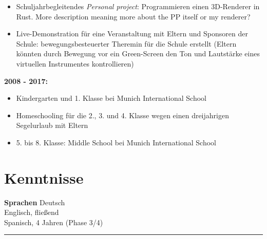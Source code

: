 \documentclass[12pt]{article}
\newcommand{\sect}[1]{\vspace{-12pt}\section*{#1}\vspace{-12pt}}
\newcommand{\sep}{{\color{gray}\vspace{-12pt}\hrule}}
\newcommand{\ask}[1]{{\color{red}#1}}
\begin{document}
{\begin{itemize}
\begin{itemize}
    \item \glqq Science Extension\grqq: erweiterte Physik, Chemie und Biologie, 3 Stunden pro Woche

    \item Musik, 3 Stunden pro Woche
    \end{itemize}

  \item Schuljahrbegleitendes \textit{\glqq Personal project\grqq}:
    Programmieren einen 3D-Renderer in Rust. \ask{More description meaning more
      about the PP itself or my renderer?}

  \item Live-Demonstration f{\"u}r eine Veranstaltung mit Eltern und Sponsoren
    der Schule: bewegungsbesteuerter Theremin f{\"u}r die Schule erstellt
    (Eltern k{\"o}nnten durch Bewegung vor ein Green-Screen den Ton und
    Lautst{\"a}rke eines virtuellen Instrumentes kontrollieren)
  \end{itemize}

  \textbf{2008 - 2017:
  }
  \vspace{-10pt}
  \begin{itemize}
    \itemsep3pt
  \item Kindergarten und 1. Klasse bei Munich International School

  \item Homeschooling f{\"u}r die 2., 3. und 4. Klasse wegen einen dreijahrigen Segelurlaub mit Eltern

  \item 5. bis 8. Klasse: Middle School bei Munich International School
  \end{itemize}


  \sect{Kenntnisse}
  \textbf{Sprachen} \hfill{Deutsch} \\
  \hspace*{\fill}Englisch, flie{\ss}end \\
  \hspace*{\fill}Spanisch, 4 Jahren (Phase 3/4) \\
  \sep

}
\end{document}
